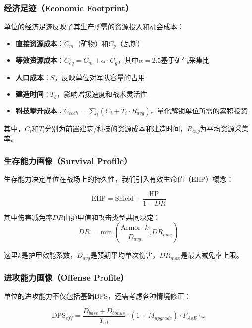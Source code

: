\documentclass[a4paper,12pt]{article}
\begin{document}
\begin{CJK}{UTF8}{gbsn}
\subsubsection{经济足迹（Economic Footprint）}
单位的经济足迹反映了其生产所需的资源投入和机会成本：

\begin{itemize}
\item \textbf{直接资源成本}：$C_m$（矿物）和$C_g$（瓦斯）
\item \textbf{等效资源成本}：$C_{eq} = C_m + \alpha \cdot C_g$，其中$\alpha = 2.5$基于矿气采集比
\item \textbf{人口成本}：$S$，反映单位对军队容量的占用
\item \textbf{建造时间}：$T_b$，影响增援速度和战术灵活性
\item \textbf{科技攀升成本}：$C_{tech} = \sum_{i} (C_i + T_i \cdot R_{avg})$，量化解锁单位所需的累积投资
\end{itemize}

其中，$C_i$和$T_i$分别为前置建筑/科技的资源成本和建造时间，$R_{avg}$为平均资源采集率。

\subsubsection{生存能力画像（Survival Profile）}
生存能力决定单位在战场上的持久性，我们引入有效生命值（EHP）概念：

\begin{equation}
\text{EHP} = \text{Shield} + \frac{\text{HP}}{1 - DR}
\end{equation}

其中伤害减免率$DR$由护甲值和攻击类型共同决定：
\begin{equation}
DR = \min\left(\frac{\text{Armor} \cdot k}{D_{avg}}, DR_{max}\right)
\end{equation}

这里$k$是护甲效能系数，$D_{avg}$是预期平均单次伤害，$DR_{max}$是最大减免率上限。

\subsubsection{进攻能力画像（Offense Profile）}
单位的进攻能力不仅包括基础DPS，还需考虑各种情境修正：

\begin{equation}
\text{DPS}_{eff} = \frac{D_{base} + D_{bonus}}{T_{cd}} \cdot (1 + M_{upgrade}) \cdot F_{AoE} \cdot \omega
\end{equation}


\end{CJK}
\end{document}
